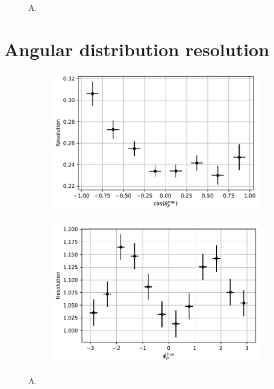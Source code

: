 \begin{figure}[t]
\begin{subfigure}{.45\textwidth}
		\caption{}
		\label{fig:5:MCRECO_phi_reco}
	\end{subfigure}
	\caption{A.}
	\label{fig:5:phi_distributions}
\end{figure}

\section{Angular distribution resolution}

\begin{figure}[t]
	\centering
	\begin{subfigure}{.45\textwidth}
		\includegraphics[height=.2\textheight]{graphics/05-angular_distributions/MCRECO_p_theta_resolution.pdf}
		\caption{}
		\label{fig:5:MCRECO_p_theta_resolution}
	\end{subfigure}
	\begin{subfigure}{.45\textwidth}
		\includegraphics[height=.2\textheight]{graphics/05-angular_distributions/MCRECO_p_phi_resolution.pdf}
		\caption{}
		\label{fig:5:MCRECO_p_phi_resolution}
	\end{subfigure}
	\caption{A.}
	\label{fig:5:angular_resolutions}
\end{figure}

